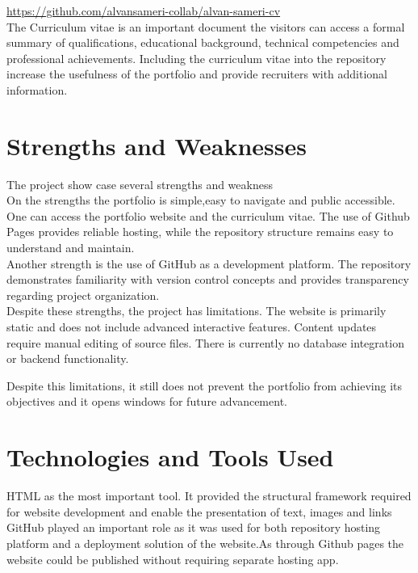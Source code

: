 \documentclass[10pt, titlepage, oneside, a4paper]{article}
\begin{document}
\url{https://github.com/alvansameri-collab/alvan-sameri-cv} \\
The Curriculum vitae is an important document the visitors can access a formal summary of qualifications, educational background, technical competencies and professional achievements. Including the curriculum vitae into the repository increase the usefulness of the portfolio and provide recruiters with additional information. \\

 \section{Strengths and Weaknesses}
 The project show case several strengths and weakness \\

 On the strengths the portfolio is simple,easy to navigate and public accessible. One can access the portfolio website and the curriculum vitae. The use of Github Pages provides  reliable hosting, while the repository structure remains easy to understand and maintain. \\

 Another strength is the use of GitHub as a development platform. The repository demonstrates familiarity with version control concepts and provides transparency regarding project organization. \\

 Despite these strengths, the project has limitations. The website is primarily static and does not include advanced interactive features. Content updates require manual editing of source files. There is currently no database integration or backend functionality.

Despite this limitations, it still does not prevent the portfolio from achieving its objectives and it opens windows for future advancement.

\section{Technologies and Tools Used}

HTML as the most important tool. It provided the structural framework required for website development and enable the presentation of text, images and links \\

GitHub played an important role as it was used for both repository hosting platform and a deployment solution of the website.As through Github pages the website could be published without requiring separate hosting app. \\
\end{document}
